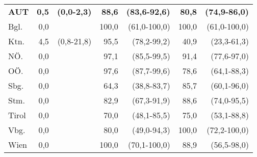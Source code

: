 \begin{table}[H]
\begin{tabular}{l|*{2}{rr|}rr}
	    \textbf{AUT} & \textbf{0,5} & \textbf{(0,0-2,3)} & \textbf{88,6} & \textbf{(83,6-92,6)} &  \textbf{80,8} &  \textbf{(74,9-86,0)} \\
        Bgl. & 0,0 &        & 100,0 & (61,0-100,0) &  100,0 & (61,0-100,0) \\
        Ktn. & 4,5 & (0,8-21,8) & 95,5 & (78,2-99,2) &  40,9 &  (23,3-61,3) \\
        NÖ. & 0,0 &       & 97,1 & (85,5-99,5) &  91,4 &  (77,6-97,0) \\
        OÖ. & 0,0 &       & 97,6 & (87,7-99,6) &  78,6 &  (64,1-88,3) \\
        Sbg. & 0,0 &         & 64,3 & (38,8-83,7) &  85,7 &  (60,1-96,0) \\
        Stm. & 0,0 &        & 82,9 & (67,3-91,9) &  88,6 &  (74,0-95,5) \\
        Tirol & 0,0 &        & 70,0 & (48,1-85,5) &  75,0 &  (53,1-88,8) \\
        Vbg. & 0,0 &         & 80,0 & (49,0-94,3) &  100,0 & (72,2-100,0) \\
        Wien & 0,0 &        & 100,0 & (70,1-100,0) &  88,9 &  (56,5-98,0) \\

        \bottomrule
    \end{tabular}

\end{table}